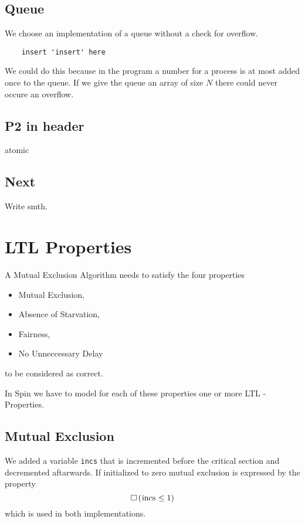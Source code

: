 \documentclass{llncs}
\begin{document}
\subsection{Queue}

We choose an implementation of a queue without a check for overflow.
\begin{lstlisting}
    insert 'insert' here
\end{lstlisting}
We could do this because in the program a number for a process is at most added once to the queue.
If we give the queue an array of size $N$ there could never occure an overflow.

\subsection{P2 in header}

atomic

\subsection{Next}

Write smth.

\section{LTL Properties}

A Mutual Exclusion Algorithm needs to satisfy the four properties
\begin{itemize}
    \item Mutual Exclusion,
    \item Absence of Starvation,
    \item Fairness,
    \item No Unneccessary Delay
\end{itemize}
to be considered as correct.

In Spin we have to model for each of these properties one or more
LTL - Properties.

\subsection{Mutual Exclusion}

We added a variable \lstinline|incs| that is incremented before the critical section
and decremented aftarwards. If initialized to zero mutual exclusion is expressed by the
property
\begin{equation}
    \square \left( \text{\lstinline|incs|} \leq 1 \right)
\end{equation}
which is used in both implementations.
\end{document}
